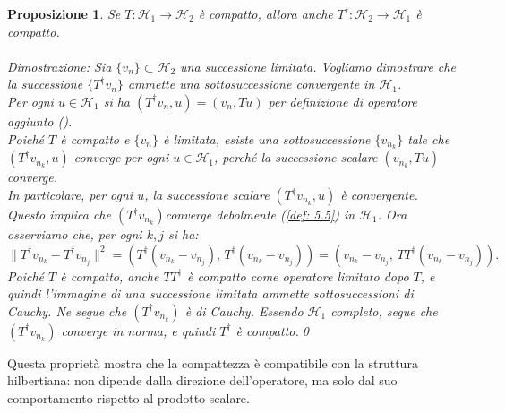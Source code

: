 \documentclass[a4paper,12pt]{report}
\newtheorem{proposizione}{Proposizione}[chapter]
\begin{document}
\begin{proposizione}
Se \(T:\mathscr{H}_1\to\mathscr{H}_2\) è compatto, allora anche \(T^\dagger:\mathscr{H}_2\to\mathscr{H}_1\) è compatto.
\\
\\\underline{Dimostrazione}: Sia \(\{v_n\}\subset \mathscr{H}_2\) una successione limitata. Vogliamo dimostrare che la successione \(\{T^\dagger v_n\}\) ammette una sottosuccessione convergente in \(\mathscr{H}_1\).
\\Per ogni \(u\in \mathscr{H}_1\) si ha $(T^\dagger v_n, u) = (v_n, Tu)$ per definizione di operatore aggiunto (\label{def: 5.8}).
\\Poiché $T$ è compatto e $\{v_n\}$ è limitata, esiste una sottosuccessione $\{v_{n_k}\}$ tale che $(T^\dagger v_{n_k}, u)$ converge per ogni \(u\in\mathscr{H}_1\), perché la successione scalare \((v_{n_k}, Tu)\) converge.
\\In particolare, per ogni \(u\), la successione scalare \((T^\dagger v_{n_k}, u)\) è convergente. Questo implica che \((T^\dagger v_{n_k})\)converge debolmente (\ref{def: 5.5}) in \(\mathscr{H}_1\). Ora osserviamo che, per ogni \(k,j\) si ha: 
\[
\|T^\dagger v_{n_k} - T^\dagger v_{n_j}\|^2
= (T^\dagger(v_{n_k}-v_{n_j}),\, T^\dagger(v_{n_k}-v_{n_j}))
= (v_{n_k}-v_{n_j},\, TT^\dagger (v_{n_k}-v_{n_j})).
\]
Poiché \(T\) è compatto, anche \(TT^\dagger\) è compatto come operatore limitato dopo \(T\), e quindi l’immagine di una successione limitata ammette sottosuccessioni di Cauchy. Ne segue che \((T^\dagger v_{n_k})\) è di Cauchy. Essendo \(\mathscr{H}_1\) completo, segue che \((T^\dagger v_{n_k})\) converge in norma, e quindi \(T^\dagger\) è compatto.\qed

\end{proposizione}

Questa proprietà mostra che la compattezza è compatibile con la struttura hilbertiana: non dipende dalla direzione dell’operatore, ma solo dal suo comportamento rispetto al prodotto scalare.
\end{document}

